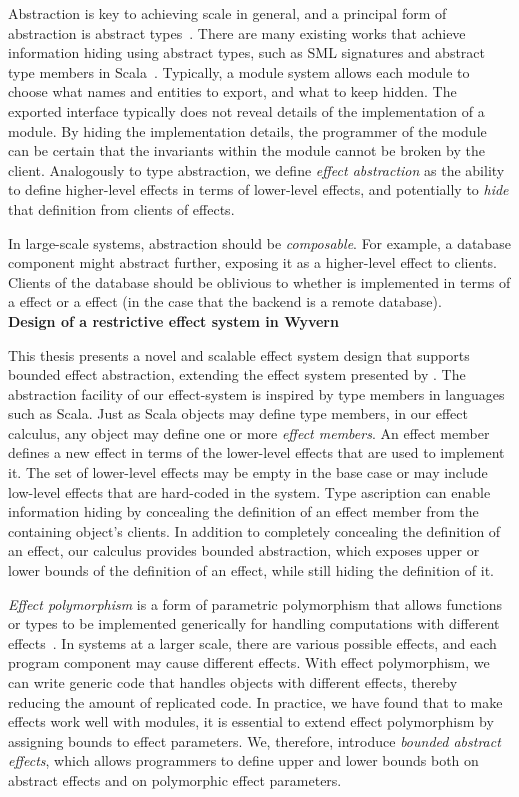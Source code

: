 Abstraction is key to achieving scale in general, and a principal form of abstraction is abstract types~\cite{10.1145/44501.45065}. 
There are many existing works that achieve information hiding using abstract types, such as SML signatures and abstract type members in Scala~\cite{odersky05}. 
Typically, a module system allows each module to choose what names and entities to export, and what to keep hidden. The exported interface typically does not reveal details of the implementation of a module. By hiding the implementation details, the programmer of the module can be certain that the invariants within the module cannot be broken by the client. Analogously to type abstraction, we define \textit{effect abstraction} as the ability to define higher-level effects in terms of lower-level effects, and potentially to \textit{hide} that definition from clients of effects.  

In large-scale systems, abstraction should be \textit{composable}.  For example, a database component might abstract  further, exposing it as a higher-level  effect to clients.  Clients of the database should be oblivious to whether  is implemented in terms of a  effect or a  effect (in the case that the backend is a remote database). \\

\noindent\textbf{Design of a restrictive effect system in Wyvern}

This thesis presents a novel and scalable effect system design that supports bounded effect abstraction, extending the effect system presented by \citet{melicher20}.  The abstraction facility of our effect-system is inspired by type members in languages such as Scala. Just as Scala objects may define type members, in our effect calculus, any object may define one or more \textit{effect members}.  An effect member defines a new effect in terms of the lower-level effects that are used to implement it.  The set of lower-level effects may be empty in the base case or may include low-level effects that are hard-coded in the system.  Type ascription can enable information hiding by concealing the definition of an effect member from the containing object's clients. In addition to completely concealing the definition of an effect, our calculus provides bounded abstraction, which exposes upper or lower bounds of the definition of an effect, while still hiding the definition of it.  


\textit{Effect polymorphism} is a form of parametric polymorphism that allows functions or types to be implemented generically for handling computations with different effects~\cite{lucassen88}. In systems at a larger scale, there are various possible effects, and each program component may cause different effects. With effect polymorphism, we can write generic code that handles objects with different effects, thereby reducing the amount of replicated code. In practice, we have found that to make effects work well with modules, it is essential to extend effect polymorphism by assigning bounds to effect parameters. We, therefore, introduce \textit{bounded abstract effects}, which allows programmers to define upper and lower bounds both on abstract effects and on polymorphic effect parameters.

